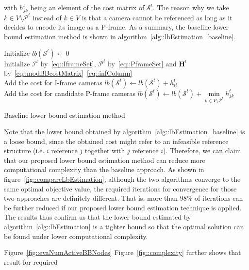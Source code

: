 with $h_{jk}^t$ being an element of the cost matrix of $\mathcal{S}^t$.
The reason why we take $k \in V \setminus \mathcal{P}^t$ instead of $k \in V$ is that a camera cannot be referenced as long as it decides to encode its image as a P-frame.
As a summary, the baseline lower bound estimation method is shown in algorithm~\ref{alg::lbEstimation_baseline}.
%
\IncMargin{1em}
\begin{algorithm}[]
 \SetAlgoLined
 \BlankLine
 Initialize $lb(\mathcal{S}^t) \gets 0$\\
 Initialize $\mathcal{I}^t$ by~\eqref{eq::IframeSet}, $\mathcal{P}^t$ by~\eqref{eq::PframeSet} and $\mathbf{H}^t$ by~\eqref{eq::modBBcostMatrix}~\eqref{eq::infColumn} \\
 {
 	Add the cost for I-frame cameras $lb(\mathcal{S}^t) \gets lb(\mathcal{S}^t) + h_{ii}^t$ \\
 }
 {
 	Add the cost for candidate P-frame cameras $lb(\mathcal{S}^t) \gets lb(\mathcal{S}^t) + \underset{k \in V \setminus \mathcal{P}^t}{\min} h_{jk}^t$ \\
 }
 \caption{\label{alg::lbEstimation_baseline}Baseline lower bound estimation method}
\end{algorithm}
\DecMargin{1em}
%

Note that the lower bound obtained by algorithm~\ref{alg::lbEstimation_baseline} is a loose bound, since the obtained cost might refer to an infeasible reference structure (i.e. $i$ reference $j$ together with $j$ reference $i$).
Therefore, we can claim that our proposed lower bound estimation method can reduce more computational complexity than the baseline approach.
As shown in figure~\ref{fig::compareLbEstimation}, although the two algorithms converge to the same optimal objective value, the required iterations for convergence for those two approaches are definitely different.
That is, more than $98\%$ of iterations can be further reduced if our proposed lower bound estimation technique is applied.
The results thus confirm us that the lower bound estimated by algorithm~\ref{alg::lbEstimation} is a tighter bound so that the optimal solution can be found under lower computational complexity.

Figure~\ref{fig::evaNumActiveBBNodes}
Figure~\ref{fig::complexity} further shows that result for required

